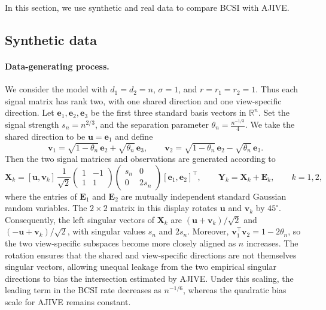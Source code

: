 \documentclass[11pt]{article}
\newcommand{\trans}{\top}
\begin{document}
In this section, we use synthetic and real data to compare BCSI with AJIVE.



\subsection{Synthetic data}
\label{sec:numerical-synthetic}

\paragraph{Data-generating process.}
We consider the model with $d_1=d_2=n$, $\sigma=1$, and
$r=r_1=r_2=1$. Thus each signal matrix has rank two, with one shared
direction and one view-specific direction. Let
$\bm e_1,\bm e_2,\bm e_3$ be the first three standard basis vectors in $\mathbb{R}^n$. 
Set the signal strength $s_n = n^{2/3}$, and the separation parameter $  \theta_n=\frac{n^{-1/3}}{4}$. We take the shared direction to be
$\bm u=\bm e_1$ and define
\[
  \bm v_1
  =
  \sqrt{1-\theta_n}\,\bm e_2+\sqrt{\theta_n}\,\bm e_3,
  \qquad
  \bm v_2
  =
  \sqrt{1-\theta_n}\,\bm e_2-\sqrt{\theta_n}\,\bm e_3.
\]
Then the two signal matrices and observations are generated
according to
\[
  \bm X_k
  =
  [\bm u,\bm v_k]\,
  \frac{1}{\sqrt{2}}
  \begin{pmatrix}
    1 & -1\\
    1 &  1
  \end{pmatrix}
  \begin{pmatrix}
    s_n & 0\\
    0 & 2s_n
  \end{pmatrix}
  [\bm e_1,\bm e_2]^\trans,
  \qquad
  \bm Y_k=\bm X_k+\bm E_k,
  \qquad k=1,2,
\]
where the entries of $\bm E_1$ and $\bm E_2$ are mutually independent
standard Gaussian random variables. The $2\times2$ matrix in this
display rotates $\bm u$ and $\bm v_k$ by $45^\circ$. Consequently, the
left singular vectors of $\bm X_k$ are
$(\bm u+\bm v_k)/\sqrt{2}$ and
$(-\bm u+\bm v_k)/\sqrt{2}$, with singular values $s_n$ and $2s_n$.
Moreover, $\bm v_1^\trans\bm v_2=1-2\theta_n$, so the two view-specific
subspaces become more closely aligned as $n$ increases. The rotation
ensures that the shared and view-specific directions are not themselves
singular vectors, allowing unequal leakage from the two empirical
singular directions to bias the intersection estimated by AJIVE. Under
this scaling, the leading term in the BCSI rate decreases as
$n^{-1/6}$, whereas the quadratic bias scale for AJIVE remains constant.
\end{document}
